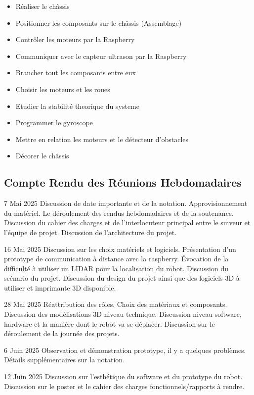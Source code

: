 \documentclass[a4paper,12pt]{report}  %
\begin{document}
\begin{itemize}
	\item Réaliser le châssis
	\item Positionner les composants sur le châssis (Assemblage)
	\item Contrôler les moteurs par la Raspberry
	\item Communiquer avec le capteur ultrason par la Raspberry
	\item Brancher tout les composants entre eux
	\item Choisir les moteurs et les roues
	\item Etudier la stabilité theorique du systeme 
	\item Programmer le gyroscope
	\item Mettre en relation les moteurs et le détecteur d'obstacles
	\item Décorer le châssis
\end{itemize}

\subsection{Compte Rendu des Réunions Hebdomadaires}

7 Mai 2025 
Discussion de date importante et de la notation.
Approvisionnement du matériel.
Le déroulement des rendus hebdomadaires et de la soutenance.
Discussion du cahier des charges et de l'interlocuteur principal entre le suiveur et l’équipe de projet.
Discussion de l’architecture du projet.


16 Mai 2025
Discussion sur les choix matériels et logiciels.
Présentation d'un prototype de communication à distance avec la raspberry.
Évocation de la difficulté à utiliser un LIDAR pour la localisation du robot.
Discussion du scénario du projet.
Discussion du design du projet ainsi que des logiciels 3D à utiliser et imprimante 3D disponible.


28 Mai 2025
Réattribution des rôles.
Choix des matériaux et composants.
Discussion des modélisations 3D niveau technique.
Discussion niveau software, hardware et la manière dont le robot va se déplacer.
Discussion sur le déroulement de la journée des projets.


6 Juin 2025
Observation et démonstration prototype, il y a quelques problèmes.
Détails supplémentaires sur la notation.


12 Juin 2025
Discussion sur l’esthétique du software et du prototype du robot.
Discussion sur le poster et le cahier des charges fonctionnels/rapports à rendre.
\end{document}
